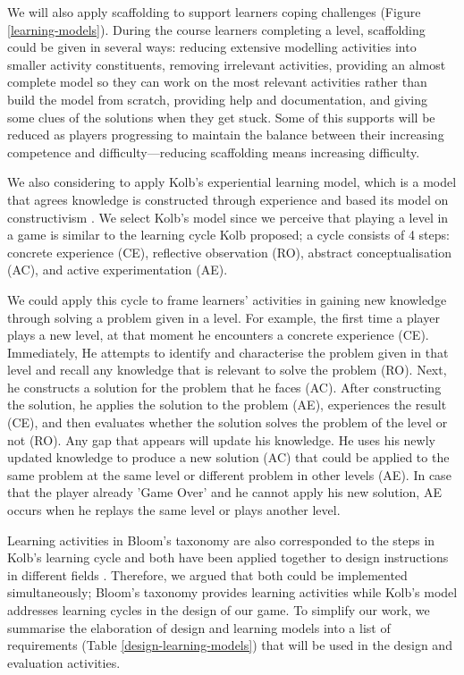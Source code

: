 \documentclass[12pt, a4paper]{report}
\begin{document}
We will also apply scaffolding \cite{vygotsky1978mind, wood1976role} to support learners coping challenges (Figure \ref{learning-models}). During the course learners completing a level, scaffolding could be given in several ways: reducing extensive modelling activities into smaller activity constituents, removing irrelevant activities, providing an almost complete model so they can work on the most relevant activities rather than build the model from scratch, providing help and documentation, and giving some clues of the solutions when they get stuck. Some of this supports will be reduced as players progressing to maintain the balance between their increasing competence and difficulty---reducing scaffolding means increasing difficulty. 

We also considering to apply Kolb's experiential learning model, which is a model that agrees knowledge is constructed through experience and based its model on constructivism \cite{kolb2014experiential}. We select Kolb's model since we perceive that playing a level in a game is similar to the learning cycle Kolb proposed; a cycle consists of 4 steps: concrete experience (CE), reflective observation (RO), abstract conceptualisation (AC), and active experimentation (AE). 

We could apply this cycle to frame learners' activities in gaining new knowledge through solving a problem given in a level. For example, the first time a player plays a new level, at that moment he encounters a concrete experience (CE). Immediately, He attempts to identify and characterise the problem given in that level and recall any knowledge that is relevant to solve the problem (RO). Next, he constructs a solution for the problem that he faces (AC). After constructing the solution, he applies the solution to the problem (AE), experiences the result (CE), and then evaluates whether the solution solves the problem of the level or not (RO). Any gap that appears will update his knowledge. He uses his newly updated knowledge to produce a new solution (AC) that could be applied to the same problem at the same level or different problem in other levels (AE). In case that the player already 'Game Over' and he cannot apply his new solution, AE occurs when he replays the same level or plays another level.

Learning activities in Bloom's taxonomy are also corresponded to the steps in Kolb's learning cycle \cite{murphy2007prior} and both have been applied together to design instructions in different fields \cite{terry1993kolb, howard1996felder, schatzberg2002applying}. Therefore, we argued that both could be implemented simultaneously; Bloom's taxonomy provides learning activities while Kolb's model addresses learning cycles in the design of our game. To simplify our work, we summarise the elaboration of design and learning models into a list of requirements (Table \ref{design-learning-models}) that will be used in the design and evaluation activities.
\end{document}
